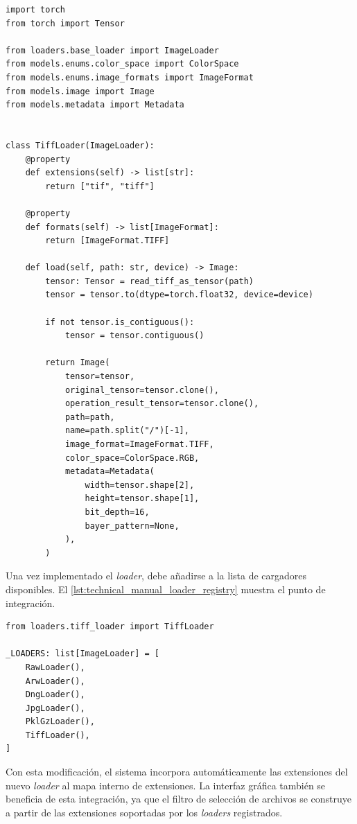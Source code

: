 \begin{lstlisting}[style=pythonstyle, caption={Estructura simplificada de un nuevo \textit{loader}}, label={lst:technical_manual_loader_example}]
import torch
from torch import Tensor

from loaders.base_loader import ImageLoader
from models.enums.color_space import ColorSpace
from models.enums.image_formats import ImageFormat
from models.image import Image
from models.metadata import Metadata


class TiffLoader(ImageLoader):
    @property
    def extensions(self) -> list[str]:
        return ["tif", "tiff"]

    @property
    def formats(self) -> list[ImageFormat]:
        return [ImageFormat.TIFF]

    def load(self, path: str, device) -> Image:
        tensor: Tensor = read_tiff_as_tensor(path)
        tensor = tensor.to(dtype=torch.float32, device=device)

        if not tensor.is_contiguous():
            tensor = tensor.contiguous()

        return Image(
            tensor=tensor,
            original_tensor=tensor.clone(),
            operation_result_tensor=tensor.clone(),
            path=path,
            name=path.split("/")[-1],
            image_format=ImageFormat.TIFF,
            color_space=ColorSpace.RGB,
            metadata=Metadata(
                width=tensor.shape[2],
                height=tensor.shape[1],
                bit_depth=16,
                bayer_pattern=None,
            ),
        )
\end{lstlisting}

\newpage

Una vez implementado el \textit{loader}, debe añadirse a la lista de cargadores
disponibles. El \autoref{lst:technical_manual_loader_registry} muestra el punto
de integración.

\begin{lstlisting}[style=pythonstyle, caption={Registro de un nuevo \textit{loader}}, label={lst:technical_manual_loader_registry}]
from loaders.tiff_loader import TiffLoader

_LOADERS: list[ImageLoader] = [
    RawLoader(),
    ArwLoader(),
    DngLoader(),
    JpgLoader(),
    PklGzLoader(),
    TiffLoader(),
]
\end{lstlisting}

Con esta modificación, el sistema incorpora automáticamente las extensiones del
nuevo \textit{loader} al mapa interno de extensiones. La interfaz gráfica también
se beneficia de esta integración, ya que el filtro de selección de archivos se
construye a partir de las extensiones soportadas por los \textit{loaders}
registrados.

